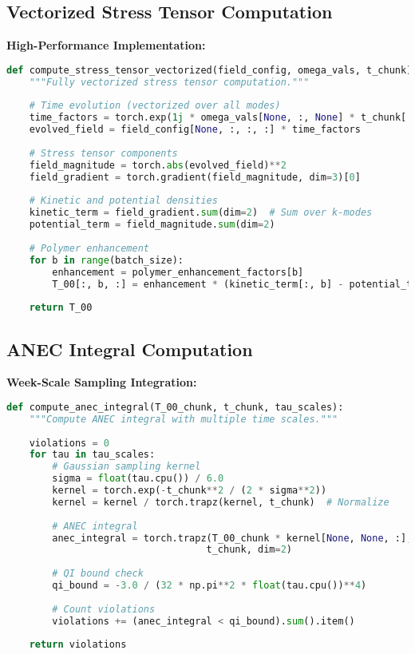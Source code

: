 \documentclass[11pt]{article}
\begin{document}
\subsection{Vectorized Stress Tensor Computation}

\textbf{High-Performance Implementation:}
\begin{lstlisting}[language=Python]
def compute_stress_tensor_vectorized(field_config, omega_vals, t_chunk):
    """Fully vectorized stress tensor computation."""
    
    # Time evolution (vectorized over all modes)
    time_factors = torch.exp(1j * omega_vals[None, :, None] * t_chunk[:, None, None])
    evolved_field = field_config[None, :, :, :] * time_factors
    
    # Stress tensor components
    field_magnitude = torch.abs(evolved_field)**2
    field_gradient = torch.gradient(field_magnitude, dim=3)[0]
    
    # Kinetic and potential densities
    kinetic_term = field_gradient.sum(dim=2)  # Sum over k-modes
    potential_term = field_magnitude.sum(dim=2)
    
    # Polymer enhancement
    for b in range(batch_size):
        enhancement = polymer_enhancement_factors[b]
        T_00[:, b, :] = enhancement * (kinetic_term[:, b] - potential_term[:, b])
    
    return T_00
\end{lstlisting}

\subsection{ANEC Integral Computation}

\textbf{Week-Scale Sampling Integration:}
\begin{lstlisting}[language=Python]
def compute_anec_integral(T_00_chunk, t_chunk, tau_scales):
    """Compute ANEC integral with multiple time scales."""
    
    violations = 0
    for tau in tau_scales:
        # Gaussian sampling kernel
        sigma = float(tau.cpu()) / 6.0
        kernel = torch.exp(-t_chunk**2 / (2 * sigma**2))
        kernel = kernel / torch.trapz(kernel, t_chunk)  # Normalize
        
        # ANEC integral
        anec_integral = torch.trapz(T_00_chunk * kernel[None, None, :], 
                                   t_chunk, dim=2)
        
        # QI bound check
        qi_bound = -3.0 / (32 * np.pi**2 * float(tau.cpu())**4)
        
        # Count violations
        violations += (anec_integral < qi_bound).sum().item()
    
    return violations
\end{lstlisting}
\end{document}
